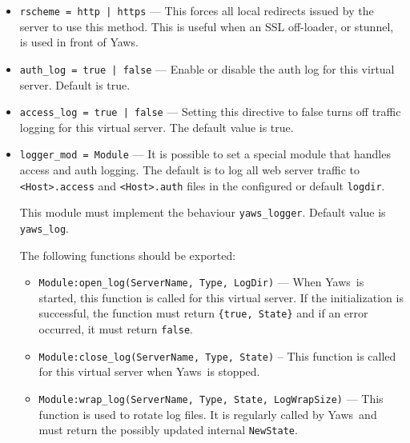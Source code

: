 \documentclass[11pt,oneside,english]{book}
\newcommand{\Yaws}            %
        {{\sc Yaws}}
\begin{document}
\begin{itemize}
\item       \verb+rscheme = http | https+ ---
              This forces  all  local  redirects  issued  by  the
              server  to  use this method. This is useful when an
              SSL off-loader, or stunnel, is  used  in  front  of
              \Yaws{}.

\item       \verb+auth_log = true | false+ ---
              Enable or disable the auth log for this virtual server.
              Default is true.

\item       \verb+access_log = true | false+ ---
              Setting  this  directive  to  false turns off
              traffic logging for this virtual server. The
              default value is true.

\item       \verb+logger_mod = Module+ ---
              It is possible to set a special module that handles access and
              auth logging. The default is to log all web server traffic to
              \verb+<Host>.access+ and \verb+<Host>.auth+ files in the
              configured or default \verb+logdir+.

              This module must implement the behaviour
              \verb+yaws_logger+. Default value is \verb+yaws_log+.

              The following functions should be exported:

              \begin{itemize}

              \item \verb+Module:open_log(ServerName, Type, LogDir)+ --- When
                \Yaws\ is started, this function is called for this virtual
                server. If the initialization is successful, the function must
                return \verb+{true, State}+ and if an error occurred, it must
                return \verb+false+.

              \item \verb+Module:close_log(ServerName, Type, State)+ -- This
                function is called for this virtual server when
                \Yaws\ is stopped.

              \item \verb+Module:wrap_log(ServerName, Type, State, LogWrapSize)+
                --- This function is used to rotate log files. It is regularly
                called by \Yaws\ and must return the possibly updated internal
                \verb+NewState+.


\end{itemize}
\end{itemize}
\end{document}
